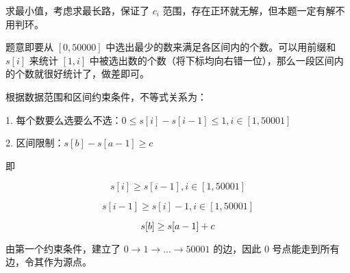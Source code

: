 求最小值，考虑求最长路，保证了 $c_i$ 范围，存在正环就无解，但本题一定有解不用判环。

题意即要从 $[0, 50000]$ 中选出最少的数来满足各区间内的个数。可以用前缀和 $s[i]$ 来统计 $[1,i]$ 中被选出数的个数（将下标均向右错一位），那么一段区间内的个数就很好统计了，做差即可。

根据数据范围和区间约束条件，不等式关系为：

1. 每个数要么选要么不选：$0 \le s[i] - s[i-1] \le 1, i \in [1,50001]$

2. 区间限制：$s[b] - s[a - 1] \ge c$

即

\begin{equation}
s[i] \ge s[i-1], i \in [1,50001]
\end{equation}

\begin{equation}
s[i-1] \ge s[i] - 1, i \in [1,50001]
\end{equation}

\begin{equation}
s[b] \ge s[a-1] + c \\
\end{equation}

由第一个约束条件，建立了 $0→1→...→50001$ 的边，因此 $0$ 号点能走到所有边，令其作为源点。